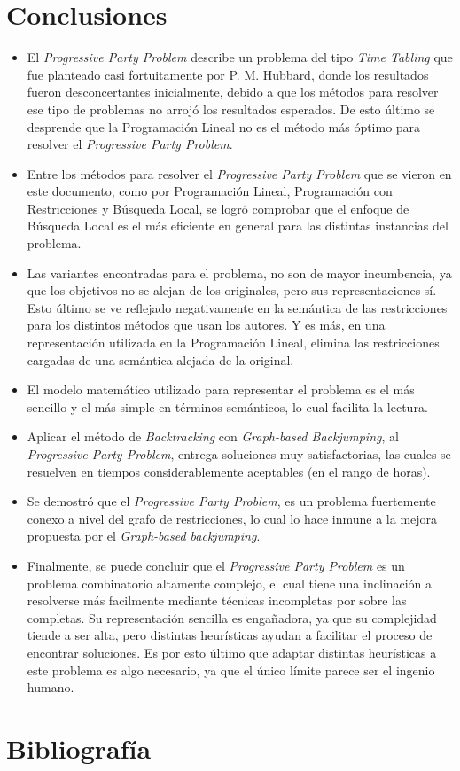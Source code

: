\documentclass[letter, 10pt]{article}
\begin{document}
\section{Conclusiones}
\begin{itemize}
\item El \textit{Progressive Party Problem} describe un problema del tipo \textit{Time Tabling} que fue planteado casi fortuitamente por P. M. Hubbard, donde los resultados fueron desconcertantes inicialmente, debido a que los métodos para resolver ese tipo de problemas no arrojó los resultados esperados. De esto último se desprende que la Programación Lineal no es el método más óptimo para resolver el \textit{Progressive Party Problem}.

\item Entre los métodos para resolver el \textit{Progressive Party Problem} que se vieron en este documento, como por Programación Lineal, Programación con Restricciones y Búsqueda Local, se logró comprobar que el enfoque de Búsqueda Local es el más eficiente en general para las distintas instancias del problema.

\item Las variantes encontradas para el problema, no son de mayor incumbencia, ya que los objetivos no se alejan de los originales, pero sus representaciones sí. Esto último se ve reflejado negativamente en la semántica de las restricciones para los distintos métodos que usan los autores. Y es más, en una representación utilizada en la Programación Lineal, elimina las restricciones cargadas de una semántica alejada de la original.

\item El modelo matemático utilizado para representar el problema es el más sencillo y el más simple en términos semánticos, lo cual facilita la lectura.

\item Aplicar el método de \textit{Backtracking} con \textit{Graph-based Backjumping}, al \textit{Progressive Party Problem}, entrega soluciones muy satisfactorias, las cuales se resuelven en tiempos considerablemente aceptables (en el rango de horas).

\item Se demostró que el \textit{Progressive Party Problem}, es un problema fuertemente conexo a nivel del grafo de restricciones, lo cual lo hace inmune a la mejora propuesta por el \textit{Graph-based backjumping}.

\item Finalmente, se puede concluir que el \textit{Progressive Party Problem} es un problema combinatorio altamente complejo, el cual tiene una inclinación a resolverse más facilmente mediante técnicas incompletas por sobre las completas. Su representación sencilla es engañadora, ya que su complejidad tiende a ser alta, pero distintas heurísticas ayudan a facilitar el proceso de encontrar soluciones. Es por esto último que adaptar distintas heurísticas a este problema es algo necesario, ya que el único límite parece ser el ingenio humano.


\end{itemize}

\section{Bibliografía}


\end{document}
